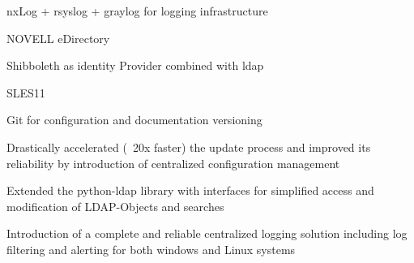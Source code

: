 \documentclass[10pt,A4]{article}
\newcommand{\cvlist}[1] {
	\begin{itemize}{#1}\end{itemize}
}
\begin{document}
\begin{paracol}{2}
\begin{rightcolumn}
{{				\item{nxLog + rsyslog + graylog for logging infrastructure}%
				\item{NOVELL eDirectory}%
				\item{Shibboleth as identity Provider combined with ldap}%
				\item{SLES11}%
				\item{Git for configuration and documentation versioning}%
		}}
		{\cvlist{
			\item{Drastically accelerated (~20x faster) the update process and improved its reliability by introduction of centralized configuration management}%
			\item{Extended the python-ldap library with interfaces for simplified access and modification of LDAP-Objects and searches}%
			\item{Introduction of a complete and reliable centralized logging solution including log filtering and alerting for both windows and Linux systems}%
		}}


\end{rightcolumn}
\end{paracol}
\end{document}
